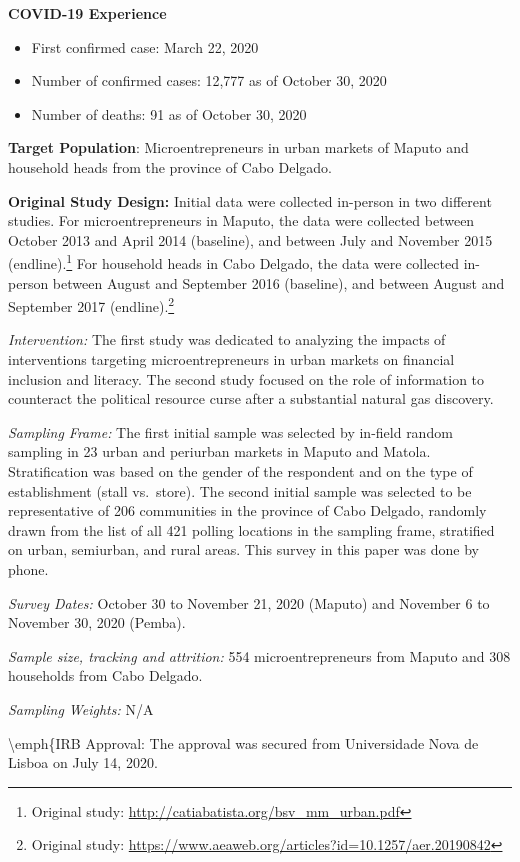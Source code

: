\documentclass[
  12pt,
]{article}
\begin{document}
\textbf{COVID-19 Experience}

\begin{itemize}
\item First confirmed case: March 22, 2020
\item Number of confirmed cases:  12,777 as of October 30, 2020 
\item Number of deaths:  91 as of October 30, 2020
\end{itemize}

\textbf{Target Population}: Microentrepreneurs in urban markets of Maputo and household heads from the province of Cabo Delgado.

\textbf{Original Study Design:} Initial data were collected in-person in two different studies. For microentrepreneurs in Maputo, the data were collected between October 2013 and April 2014 (baseline), and between July and November 2015 (endline).\footnote{Original study: \url{http://catiabatista.org/bsv_mm_urban.pdf}} For household heads in Cabo Delgado, the data were collected in-person between August and September 2016 (baseline), and between August and September 2017 (endline).\footnote{Original study: \url{https://www.aeaweb.org/articles?id=10.1257/aer.20190842}}

\emph{Intervention:} The first study was dedicated to analyzing the impacts of interventions targeting microentrepreneurs in urban markets on financial inclusion and literacy. The second study focused on the role of information to counteract the political resource curse after a substantial natural gas discovery.

\emph{Sampling Frame:} The first initial sample was selected by in-field random sampling in 23 urban and periurban markets in Maputo and Matola. Stratification was based on the gender of the respondent and on the type of establishment (stall vs.~store). The second initial sample was selected to be representative of 206 communities in the province of Cabo Delgado, randomly drawn from the list of all 421 polling locations in the sampling frame, stratified on urban, semiurban, and rural areas. This survey in this paper was done by phone.

\emph{Survey Dates:} October 30 to November 21, 2020 (Maputo) and November 6 to November 30, 2020 (Pemba).

\emph{Sample size, tracking and attrition:} 554 microentrepreneurs from Maputo and 308 households from Cabo Delgado.

\emph{Sampling Weights:} N/A

\textbackslash emph\{IRB Approval: The approval was secured from Universidade Nova de Lisboa on July 14, 2020.
\end{document}
